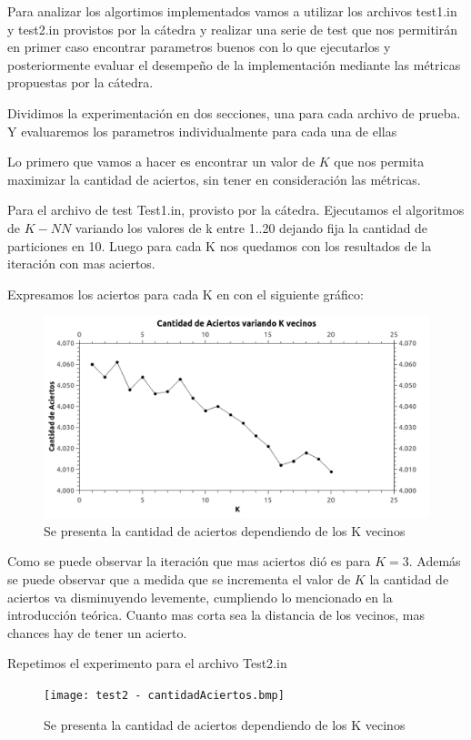 Para analizar los algortimos implementados vamos a utilizar los archivos test1.in y test2.in provistos por la cátedra y realizar una serie de test que nos permitirán en primer caso encontrar parametros buenos con lo que ejecutarlos y posteriormente evaluar el desempeño de la implementación mediante las métricas propuestas por la cátedra.

Dividimos la experimentación en dos secciones, una para cada archivo de prueba. Y evaluaremos los parametros individualmente para cada una de ellas



Lo primero que vamos a hacer es encontrar un valor de $K$ que nos permita maximizar la cantidad de aciertos, sin tener en consideración las métricas.

Para el archivo de test Test1.in, provisto por la cátedra. Ejecutamos el algoritmos de $K-NN$ variando los valores de k entre {1..20} dejando fija la cantidad de particiones en 10. Luego para cada K nos quedamos con los resultados de la iteración con mas aciertos.

Expresamos los aciertos para cada K en con el siguiente gráfico:

\begin{figure}
  \centering
  \includegraphics[width=0.7\columnwidth]{test1 - cantidadAciertos.bmp}
  \caption{Se presenta la cantidad de aciertos dependiendo de los K vecinos}
  \label{fig:test1 - cantidadAciertos.bmp}
\end{figure}

Como se puede observar la iteración que mas aciertos dió es para $K = 3$. Además se puede observar que a medida que se incrementa el valor de $K$ la cantidad de aciertos va disminuyendo levemente, cumpliendo lo mencionado en la introducción teórica. Cuanto mas corta sea la distancia de los vecinos, mas chances hay de tener un acierto.

Repetimos el experimento para el archivo Test2.in

\begin{figure}
  \centering
  \texttt{[image: test2 - cantidadAciertos.bmp]}
  \caption{Se presenta la cantidad de aciertos dependiendo de los K vecinos}
  \label{fig:test2 - cantidadAciertos.bmp}
\end{figure}


